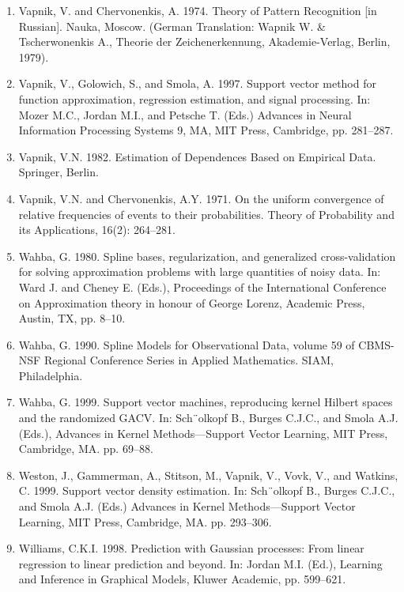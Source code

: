 \documentclass[fleqn,10pt]{olplainarticle}
\begin{document}
\begin{enumerate}
    \item Vapnik, V. and Chervonenkis, A. 1974. Theory of Pattern Recognition [in Russian]. Nauka, Moscow. (German Translation: Wapnik W. & Tscherwonenkis A., Theorie der Zeichenerkennung, Akademie-Verlag, Berlin, 1979).

    \item Vapnik, V., Golowich, S., and Smola, A. 1997. Support vector method for function approximation, regression estimation, and signal processing. In: Mozer M.C., Jordan M.I., and Petsche T. (Eds.) Advances in Neural Information Processing Systems 9, MA, MIT Press, Cambridge, pp. 281–287.

    \item Vapnik, V.N. 1982. Estimation of Dependences Based on Empirical Data. Springer, Berlin.

    \item Vapnik, V.N. and Chervonenkis, A.Y. 1971. On the uniform convergence of relative frequencies of events to their probabilities. Theory of Probability and its Applications, 16(2): 264–281.

    \item Wahba, G. 1980. Spline bases, regularization, and generalized cross-validation for solving approximation problems with large quantities of noisy data. In: Ward J. and Cheney E. (Eds.), Proceedings of the International Conference on Approximation theory in honour of George Lorenz, Academic Press, Austin, TX, pp. 8–10.

    \item Wahba, G. 1990. Spline Models for Observational Data, volume 59 of CBMS-NSF Regional Conference Series in Applied Mathematics. SIAM, Philadelphia.

    \item Wahba, G. 1999. Support vector machines, reproducing kernel Hilbert spaces and the randomized GACV. In: Sch¨olkopf B., Burges C.J.C., and Smola A.J. (Eds.), Advances in Kernel Methods—Support Vector Learning, MIT Press, Cambridge, MA. pp. 69–88.

    \item Weston, J., Gammerman, A., Stitson, M., Vapnik, V., Vovk, V., and Watkins, C. 1999. Support vector density estimation. In: Sch¨olkopf B., Burges C.J.C., and Smola A.J. (Eds.) Advances in Kernel Methods—Support Vector Learning, MIT Press, Cambridge, MA. pp. 293–306.

    \item Williams, C.K.I. 1998. Prediction with Gaussian processes: From linear regression to linear prediction and beyond. In: Jordan M.I. (Ed.), Learning and Inference in Graphical Models, Kluwer Academic, pp. 599–621.


\end{enumerate}
\end{document}
